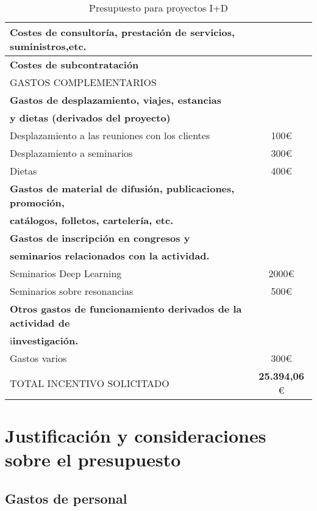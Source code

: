 \begin{table}[H]
\begin{tabular}{|l|c|}
		\cellcolor[gray]{0.8}\textbf{Costes de consultoría, prestación de servicios, suministros,etc.} &  \\ \hline
		\cellcolor[gray]{0.8}\textbf{Costes de subcontratación} &  \\ \hline
		\cellcolor[gray]{0.5}GASTOS COMPLEMENTARIOS &  \\ \hline
		\cellcolor[gray]{0.8}\textbf{Gastos de desplazamiento, viajes, estancias}    \\ 
		\cellcolor[gray]{0.8}\textbf{y dietas (derivados del proyecto)} &  \\ \hline
		Desplazamiento a las reuniones con los clientes & 100\euro \\ \hline
		Desplazamiento a seminarios & 300\euro \\ \hline
		Dietas &  400\euro \\ \hline
		\cellcolor[gray]{0.8}\textbf{Gastos de material de difusión, publicaciones, promoción,}   \\ 
		\cellcolor[gray]{0.8}\textbf{catálogos, folletos, cartelería, etc.} &  \\ \hline
		\cellcolor[gray]{0.8}\textbf{Gastos de inscripción en congresos y} \\
		\cellcolor[gray]{0.8}\textbf{seminarios relacionados con la actividad.} &  \\ \hline
		Seminarios Deep Learning &  2000\euro \\ \hline
		Seminarios sobre resonancias & 500\euro  \\ \hline
		\cellcolor[gray]{0.8}\textbf{Otros gastos de funcionamiento derivados de la actividad de} \\
		i\cellcolor[gray]{0.8}\textbf{investigación.} &  \\ \hline
		Gastos varios & 300\euro \\ \hline
		\cellcolor{red}TOTAL INCENTIVO SOLICITADO & \textbf{25.394,06} \euro \\ \bottomrule
		\end{tabular}
	\caption{Presupuesto para proyectos I+D}
	\label{tab:tabla1}
\end{table}

\section{Justificación y consideraciones sobre el presupuesto}

\subsection{Gastos de personal}

